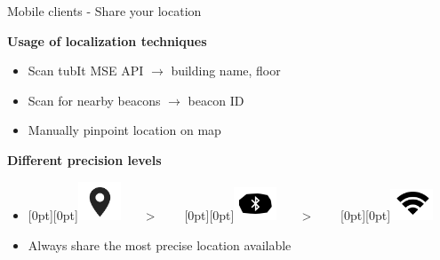 \documentclass[11pt]{beamer}
\begin{document}
\begin{frame}{Mobile clients - Share your location}

  \textbf{Usage of localization techniques}\\[1em]
  \begin{itemize}
    \item Scan tubIt MSE API $\rightarrow$ building name, floor
    \item Scan for nearby beacons $\rightarrow$  beacon ID
    \item Manually pinpoint location on map
  \end{itemize}
  \bigskip
  \pause
  \textbf{Different precision levels}\\[1em]
  \begin{itemize}
    \item \raisebox{-8pt}[0pt][0pt]{\includegraphics[width=0.1\textwidth]{location-symbol}}~~~~>~~~~%
          \raisebox{-8pt}[0pt][0pt]{\includegraphics[width=0.1\textwidth]{beacon-symbol}}~~~~>~~~~%
          \raisebox{-8pt}[0pt][0pt]{\includegraphics[width=0.1\textwidth]{wifi-symbol}}
    \item Always share the most precise location available
  \end{itemize}

\end{frame}
\end{document}
